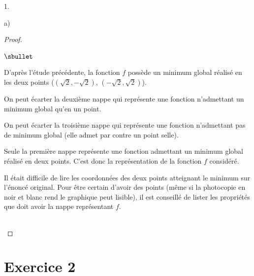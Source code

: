 \begin{noliste}{1.}
\begin{noliste}{a)}
    
    \begin{proof}~%
      \begin{noliste}{$\sbullet$}
      \item D'après l'étude précédente, la fonction $f$ possède un
        minimum global réalisé en les deux points ($(\sqrt{2},
        -\sqrt{2})$, $(-\sqrt{2}, \sqrt{2})$).
      \item On peut écarter la deuxième nappe qui représente une
        fonction n'admettant un minimum global qu'en un point.
      \item On peut écarter la troisième nappe qui représente une
        fonction n'admettant pas de minimum global (elle admet par
        contre un point selle).
      \item Seule la première nappe représente une fonction admettant
        un minimum global réalisé en deux points. C'est donc la
        représentation de la fonction $f$ considéré.          
      \end{noliste}
      \begin{remark}%
        Il était difficile de lire les coordonnées des deux points
        atteignant le minimum sur l'énoncé original. Pour être certain
        d'avoir des points (même si la photocopie en noir et blanc
        rend le graphique peut lisible), il est conseillé de lister
        les propriétés que doit avoir la nappe représentant $f$.
      \end{remark}~\\[-1.4cm]
    \end{proof}
  \end{noliste}
\end{noliste}

\section*{Exercice 2}

